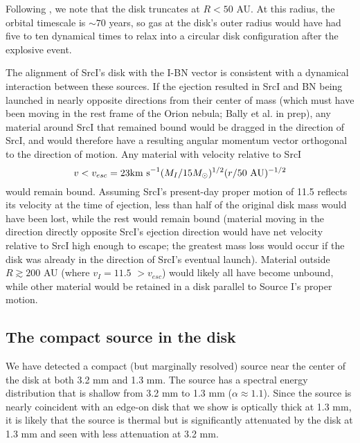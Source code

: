 \documentclass[twocolumn]{aastex61}
\newcommand{\sourcei}{SrcI\xspace}
\begin{document}
Following \citet{Bally2011a}, we note that the disk truncates at $R<50$
AU.  At this radius, the orbital timescale is $\sim70$ years, so gas at the
disk's outer radius would have had five to ten dynamical times to relax into a
circular disk configuration after the explosive event.

The alignment of \sourcei's disk with the I-BN vector is consistent with a
dynamical interaction between these sources.  If the ejection resulted in
\sourcei and BN being launched in nearly opposite directions from their center
of mass (which must have been moving in the rest frame of the Orion nebula; 
Bally et al. in prep), any material around \sourcei that remained bound would
be dragged in the direction of \sourcei, and would therefore have a resulting
angular momentum vector orthogonal to the direction of motion.  Any material
with
velocity relative to \sourcei 
$$v < v_{esc} = 23 \textrm{km~s}^{-1} (M_I/15M_{\odot})^{1/2}  (r/50~\mathrm{AU})^{-1/2}$$
would remain bound.
Assuming \sourcei's present-day proper motion of 11.5 \kms reflects its velocity
at the time of ejection, less than half of the original disk mass would
have been lost, while the rest would remain bound (material moving in the
direction directly opposite \sourcei's ejection direction would have net
velocity relative to \sourcei high enough to escape; the greatest mass
loss would occur if the disk was already in the direction of \sourcei's eventual
launch).
Material outside $R\gtrsim200$ AU (where $v_I=11.5$ \kms $> v_{esc}$) would
likely all have become unbound, while other material would be retained in a
disk parallel to Source I's proper motion.


\subsection{The compact source in the disk}
\label{sec:ptsrc}
We have detected a compact (but marginally resolved) source near the center of
the disk at both 3.2 mm and 1.3 mm.  The source has a spectral energy distribution
that is shallow from 3.2 mm to 1.3 mm ($\alpha\approx1.1$).  Since the source is nearly
coincident with an edge-on disk that we show is optically thick at 1.3 mm, it is
likely that the source is thermal but is significantly attenuated by the disk
at 1.3 mm and seen with less attenuation at 3.2 mm.
\end{document}
